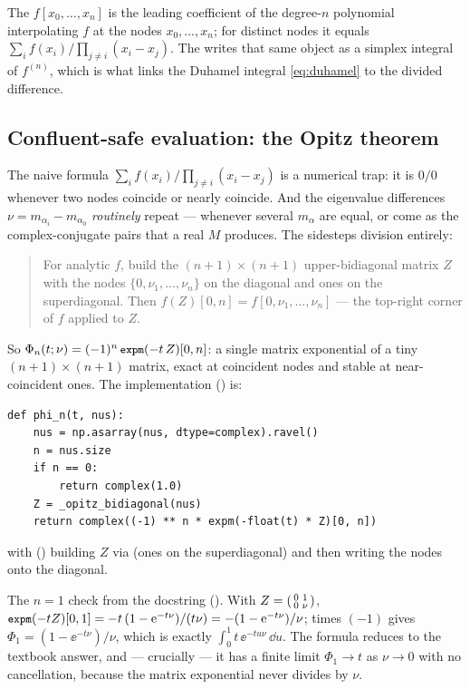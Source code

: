 \begin{defn}
The  $f[x_{0},\dots,x_{n}]$ is the leading coefficient
of the degree-$n$ polynomial interpolating $f$ at the nodes $x_{0},\dots,x_{n}$;
for distinct nodes it equals $\sum_{i}f(x_{i})/\prod_{j\ne i}(x_{i}-x_{j})$. The
 writes that same object as a simplex integral
of $f^{(n)}$, which is what links the Duhamel integral \eqref{eq:duhamel} to the
divided difference.
\end{defn}

\subsection{Confluent-safe evaluation: the Opitz theorem}

The naive formula $\sum_{i}f(x_{i})/\prod_{j\ne i}(x_{i}-x_{j})$ is a numerical
trap: it is $0/0$ whenever two nodes coincide or nearly coincide. And the
eigenvalue differences $\nu=m_{\alpha_{i}}-m_{\alpha_{0}}$ \emph{routinely}
repeat --- whenever several $m_{\alpha}$ are equal, or come as the
complex-conjugate pairs that a real $M$ produces. The 
sidesteps division entirely:

\begin{quote}
For analytic $f$, build the $(n+1)\times(n+1)$ upper-bidiagonal matrix $Z$ with
the nodes $\{0,\nu_{1},\dots,\nu_{n}\}$ on the diagonal and ones on the
superdiagonal. Then $f(Z)[0,n]=f[0,\nu_{1},\dots,\nu_{n}]$ --- the top-right
corner of $f$ applied to $Z$.
\end{quote}

So $\Phi_{n}(t;\nu)=(-1)^{n}\,\texttt{\small expm}(-t\,Z)[0,n]$: a single matrix
exponential of a tiny $(n+1)\times(n+1)$ matrix, exact at coincident nodes and
stable at near-coincident ones. The implementation
() is:

\begin{lstlisting}
def phi_n(t, nus):
    nus = np.asarray(nus, dtype=complex).ravel()
    n = nus.size
    if n == 0:
        return complex(1.0)
    Z = _opitz_bidiagonal(nus)
    return complex((-1) ** n * expm(-float(t) * Z)[0, n])
\end{lstlisting}

with  () building
$Z$ via  (ones on the superdiagonal) and then
writing the nodes onto the diagonal.

\begin{example}\label{ex:phi1}
The $n=1$ check from the docstring (). With
$Z=\begin{psmallmatrix}0&1\\0&\nu\end{psmallmatrix}$,
$\texttt{\small expm}(-tZ)[0,1]=-t\,(1-\mathrm{e}^{-t\nu})/(t\nu)=-(1-\mathrm{e}^{-t\nu})/\nu$; times
$(-1)$ gives $\Phi_{1}=(1-\ee^{-t\nu})/\nu$, which is exactly
$\int_{0}^{1}t\,\ee^{-tu\nu}\,\dd u$. The formula reduces to the textbook answer,
and --- crucially --- it has a finite limit $\Phi_{1}\to t$ as $\nu\to0$ with no
cancellation, because the matrix exponential never divides by $\nu$.
\end{example}

